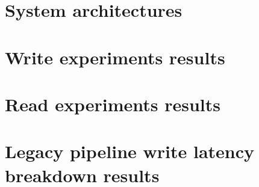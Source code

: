 \chapter{System architectures}
    \label{appx:sys_arch}
    

\chapter{Write experiments results}
    \label{appx:res_write}
    

\chapter{Read experiments results}
    \label{appx:res_read}
    

\chapter{Legacy pipeline write latency breakdown results}
    \label{appx:res_hudi}
    